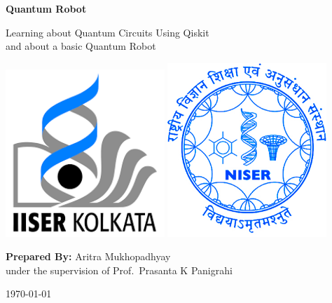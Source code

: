 \begin{titlepage}
    \begin{center}
        \vspace*{1cm}

        \textbf{\Huge Quantum Robot}

        \vspace{1cm}
        {\Large Learning about Quantum Circuits Using Qiskit\\
        and about a basic Quantum Robot}
        \vfill

        \includegraphics[width=6cm]{./images/IISER-K.png}
        \includegraphics[width=6cm]{./images/NISER.jpg}
        \vfill

        \textbf{\large Prepared By:} Aritra Mukhopadhyay\\
        under the supervision of Prof.\ Prasanta K Panigrahi
        \vfill

        \today

    \end{center}
\end{titlepage}